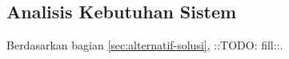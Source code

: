 \subsection{Analisis Kebutuhan Sistem}
\label{sec:analisis-kebutuhan-sistem}

Berdasarkan bagian \ref{sec:alternatif-solusi}, ::TODO: fill::.
